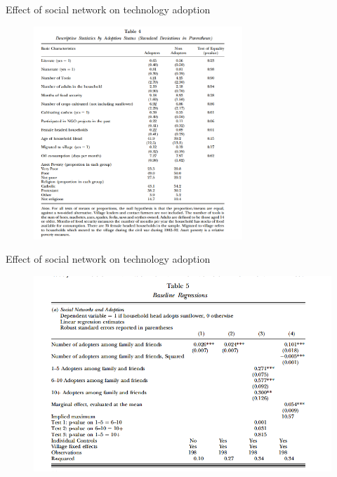 \documentclass{beamer}
\begin{document}
\begin{frame}{Effect of social network on technology adoption}{}
\begin{figure}[h]
\begin{centering}
  \includegraphics[width=0.7\textwidth]{01table4}
   \label{fig:01table4}
\end{centering}
\end{figure}
\end{frame}

\begin{frame}{Effect of social network on technology adoption}{}
\begin{figure}[h]
\begin{centering}
  \includegraphics[width=\textwidth]{01table5a}
   \label{fig:01table5a}
\end{centering}
\end{figure}
\end{frame}
\end{document}
